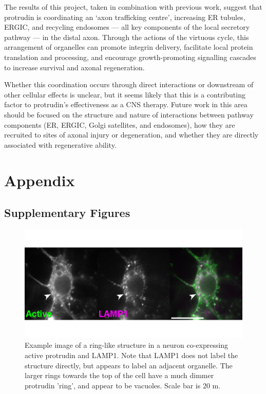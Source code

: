 \documentclass[
  12pt,
  a4paper,
]{book}
\begin{document}
The results of this project, taken in combination with previous work, suggest that protrudin is coordinating an `axon trafficking centre', increasing ER tubules, ERGIC, and recycling endosomes --- all key components of the local secretory pathway --- in the distal axon. Through the actions of the virtuous cycle, this arrangement of organelles can promote integrin delivery, facilitate local protein translation and processing, and encourage growth-promoting signalling cascades to increase survival and axonal regeneration.

Whether this coordination occurs through direct interactions or downstream of other cellular effects is unclear, but it seems likely that this is a contributing factor to protrudin's effectiveness as a CNS therapy. Future work in this area should be focused on the structure and nature of interactions between pathway components (ER, ERGIC, Golgi satellites, and endosomes), how they are recruited to sites of axonal injury or degeneration, and whether they are directly associated with regenerative ability.

\hypertarget{APPENDIX}{%
\chapter*{Appendix}\label{APPENDIX}}

\setcounter{chapter}{5}
\setcounter{section}{0}
\setcounter{figure}{0}

\hypertarget{SUPPLEMENT}{%
\section{Supplementary Figures}\label{SUPPLEMENT}}

\begin{figure}
\includegraphics{./figures/full/suppl-ring-1} \caption[Supplementary figure; Example image of a ring-like structure in a neuron]{Example image of a ring-like structure in a neuron co-expressing active protrudin and LAMP1.  Note that LAMP1 does not label the structure directly, but appears to label an adjacent organelle.  The larger rings towards the top of the cell have a much dimmer protrudin 'ring', and appear to be vacuoles.  Scale bar is 20 \textmu{}m.}\label{fig:suppl-ring}
\end{figure}
\end{document}

